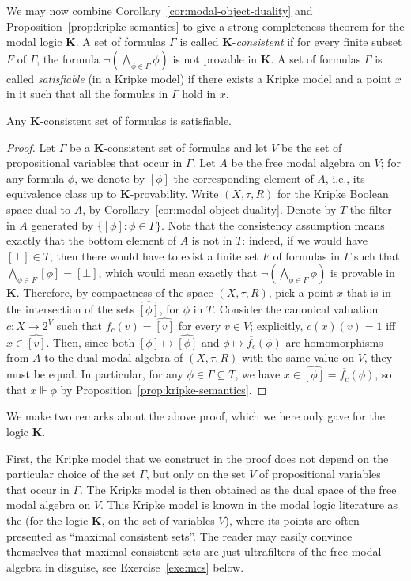 We may now combine Corollary~\ref{cor:modal-object-duality} and Proposition~\ref{prop:kripke-semantics} to give a strong completeness theorem for the modal logic $\mathbf{K}$. A set of formulas $\Gamma$ is called $\mathbf{K}$-\emph{consistent} if for every finite subset $F$ of $\Gamma$, the formula $\neg\left(\bigwedge_{\phi \in F} \phi\right)$ is not provable in $\mathbf{K}$. A set of formulas $\Gamma$ is called \emph{satisfiable} (in a Kripke model) if there exists a Kripke model and a point $x$ in it such that all the formulas in $\Gamma$ hold in $x$.
\begin{theorem}
Any $\mathbf{K}$-consistent set of formulas is satisfiable.
\end{theorem}
\begin{proof}
Let $\Gamma$ be a $\mathbf{K}$-consistent set of formulas and let $V$ be the set of propositional variables that occur in $\Gamma$. Let $A$ be the free modal algebra on $V$; for any formula $\phi$, we denote by $[\phi]$ the corresponding element of $A$, i.e., its equivalence class up to $\mathbf{K}$-provability. Write $(X,\tau, R)$ for the Kripke Boolean space dual to $A$, by Corollary~\ref{cor:modal-object-duality}. Denote by $T$ the filter in $A$ generated by $\{[\phi] \colon \phi \in \Gamma\}$. Note that the consistency assumption means exactly that the bottom element of $A$ is not in $T$: indeed, if we would have $[\bot] \in T$, then there would have to exist a finite set $F$ of formulas in $\Gamma$ such that $\bigwedge_{\phi \in F} [\phi] = [\bot]$, which would mean exactly that $\neg\left(\bigwedge_{\phi \in F} \phi\right)$ is provable in $\mathbf{K}$. Therefore, by compactness of the space $(X, \tau, R)$, pick a point $x$ that is in the intersection of the sets $\widehat{[\phi]}$, for $\phi$ in $T$. Consider the canonical valuation $c \colon X \to 2^V$ such that $f_c(v) = \widehat{[v]}$ for every $v \in V$; explicitly, $c(x)(v) = 1$ iff $x \in \widehat{[v]}$. Then, since both $[\phi] \mapsto \widehat{[\phi]}$ and $\phi \mapsto \overline{f_c}(\phi)$ are homomorphisms from $A$ to the dual modal algebra of $(X,\tau,R)$ with the same value on $V$, they must be equal. In particular, for any $\phi \in \Gamma \subseteq T$, we have $x \in \widehat{[\phi]} = \overline{f_c}(\phi)$, so that $x \Vdash \phi$ by Proposition~\ref{prop:kripke-semantics}.
\end{proof}
We make two remarks about the above proof, which we here only gave for the logic $\mathbf{K}$. 

First, the Kripke model that we construct in the proof does not depend on the particular choice of the set $\Gamma$, but only on the set $V$ of propositional variables that occur in $\Gamma$. The Kripke model is then obtained as the dual space of the free modal algebra on $V$. This Kripke model is known in the modal logic literature as the  (for the logic $\mathbf{K}$, on the set of variables $V$), where its points are often presented as ``maximal consistent sets''. The reader may easily convince themselves that maximal consistent sets are just ultrafilters of the free modal algebra in disguise, see Exercise~\ref{exe:mcs} below.

